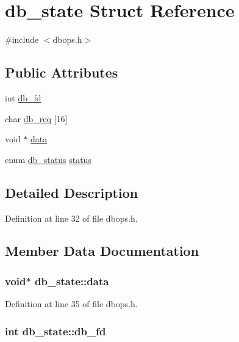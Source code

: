 \hypertarget{structdb__state}{\section{db\-\_\-state Struct Reference}
\label{structdb__state}
}


{\ttfamily \#include $<$dbops.\-h$>$}

\subsection*{Public Attributes}
\begin{DoxyCompactItemize}
\item 
int \hyperlink{structdb__state_a002ee75fd5b32dfdacf3850fe5e7096d}{db\-\_\-fd}
\item 
char \hyperlink{structdb__state_aaacfe4e1d9c23b3eeed0f6a96da1874d}{db\-\_\-req} \mbox{[}16\mbox{]}
\item 
void $\ast$ \hyperlink{structdb__state_a794093b06a3b4bde2e68fec74b447f8f}{data}
\item 
enum \hyperlink{dbops_8h_add81c081d239e1c0cdae4bf80dd6f235}{db\-\_\-status} \hyperlink{structdb__state_a55975b94a2a298c08156b77d1dae8973}{status}
\end{DoxyCompactItemize}


\subsection{Detailed Description}


Definition at line 32 of file dbops.\-h.



\subsection{Member Data Documentation}
\hypertarget{structdb__state_a794093b06a3b4bde2e68fec74b447f8f}{
\subsubsection[{data}]{\setlength{\rightskip}{0pt plus 5cm}void$\ast$ db\-\_\-state\-::data}}\label{structdb__state_a794093b06a3b4bde2e68fec74b447f8f}


Definition at line 35 of file dbops.\-h.

\hypertarget{structdb__state_a002ee75fd5b32dfdacf3850fe5e7096d}{
\subsubsection[{db\-\_\-fd}]{\setlength{\rightskip}{0pt plus 5cm}int db\-\_\-state\-::db\-\_\-fd}}\label{structdb__state_a002ee75fd5b32dfdacf3850fe5e7096d}


